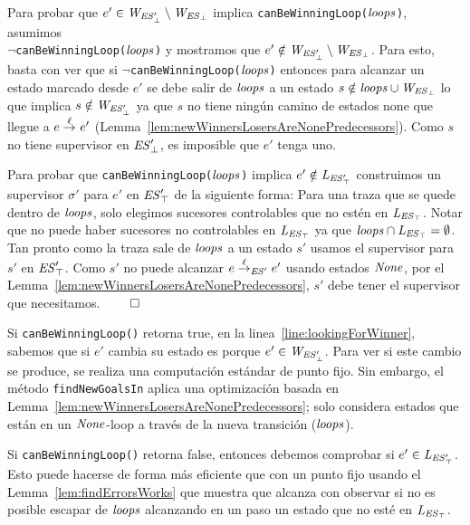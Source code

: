 \begin{Proof Sketch}
Para probar que $e' \in \mathit{W_{\mathit{\mathit{ES}'_{\bot}}}} \setminus \mathit{W_{\mathit{\mathit{ES}_{\bot}}}}$ implica \texttt{canBeWinningLoop($\mathit{loops}$)}, asumimos \\ $\neg$\texttt{canBeWinningLoop($\mathit{loops}$)} y mostramos que $e' \notin \mathit{W_{\mathit{\mathit{ES}'_{\bot}}}} 
\setminus \mathit{W_{\mathit{\mathit{ES}_{\bot}}}}$. Para esto, basta con ver que si
$\neg$\texttt{canBeWinningLoop($\mathit{loops}$)} entonces para alcanzar un estado marcado desde $e'$ se debe salir de $\mathit{loops}$ a un estado $s \notin \mathit{loops} \cup \mathit{W_{\mathit{\mathit{ES}_{\bot}}}}$ lo que implica $s \notin \mathit{W_{\mathit{\mathit{ES}'_{\bot}}}}$ 
ya que $s$ no tiene ningún camino de estados none que llegue a $e \overset{\ell}{\rightarrow}_{} e'$  (Lemma~\ref{lem:newWinnersLosersAreNonePredecessors}).
Como $s$ no tiene supervisor en $\mathit{\mathit{ES}'_{\bot}}$, es imposible que $e'$ tenga uno. 

Para probar que \texttt{canBeWinningLoop($\mathit{loops}$)} implica $e' \notin \mathit{L_{\mathit{\mathit{ES}'_{\top}}}}$ construimos un supervisor $\sigma'$ para $e'$ en $\mathit{\mathit{ES}'_{\top}}$ de la siguiente forma:
Para una traza que se quede dentro de $\mathit{loops}$, solo elegimos sucesores controlables que no estén en $\mathit{L_{\mathit{\mathit{ES}_{\top}}}}$. Notar que no puede haber sucesores no controlables en $\mathit{L_{\mathit{\mathit{ES}_{\top}}}}$ ya que
$\mathit{loops} \cap \mathit{L_{\mathit{\mathit{ES}_{\top}}}}= \emptyset$. Tan pronto como la traza sale de $\mathit{loops}$ a un estado $s'$ usamos el supervisor para $s'$ en $\mathit{\mathit{ES}'_{\top}}$. 
Como $s'$ no puede alcanzar $e \overset{\ell}{\rightarrow}_{\mathit{ES}'} 
e'$ usando estados $\mathit{None}$, por el 
Lemma~\ref{lem:newWinnersLosersAreNonePredecessors}, $s'$ debe tener el supervisor que necesitamos. \hfill$\qed$

\end{Proof Sketch}

Si \texttt{canBeWinningLoop()} retorna true, en la  linea~\ref{line:lookingForWinner}, 
sabemos que si $e'$ cambia su estado es porque $e' \in \mathit{W_{\mathit{\mathit{ES}'_{\bot}}}}$. Para ver si este cambio se produce, se realiza una computación estándar de punto fijo. 
Sin embargo, el método \texttt{findNewGoalsIn} aplica una optimización basada en Lemma~\ref{lem:newWinnersLosersAreNonePredecessors}; solo considera estados que están en un $\mathit{None}$-loop a través de la nueva transición ($\mathit{loops}$).

Si \texttt{canBeWinningLoop()} retorna false, entonces debemos comprobar si $e' \in \mathit{L_{\mathit{\mathit{ES}'_{\top}}}}$.
Esto puede hacerse de forma más eficiente que con un punto fijo usando el Lemma~\ref{lem:findErrorsWorks} que muestra que alcanza con observar si no es posible escapar de $\mathit{loops}$ alcanzando en un paso un estado que no esté en $\mathit{L_{\mathit{\mathit{ES}_{\top}}}}$. 



